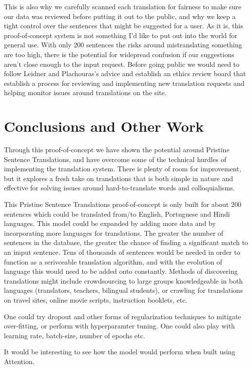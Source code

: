 \documentclass[runningheads]{llncs}
\begin{document}
This is also why we carefully scanned each translation for fairness to make sure our data was reviewed before putting it out to the public, and why we keep a tight control over the sentences that might be suggested for a user. As it is, this proof-of-concept system is not something I'd like to put out into the world for general use. With only 200 sentences the risks around mistranslating something are too high, there is the potential for widepread confusion if our suggestions aren't close enough to the input request. Before going public we would need to follow Leidner and Plachouras's advice and establish an ethics review board that establish a process for reviewing and implementing new translation requests and helping monitor issues around translations on the site.

	
	\section{Conclusions and Other Work}
	Through this proof-of-concept we have shown the potential around Pristine Sentence Translations, and have overcome some of the technical hurdles of implementing the translation system. There is plenty of room for improvement, but it explores a fresh take on translations that is both simple in nature and effective for solving issues around hard-to-translate words and colloquialisms. 
		
	This Pristine Sentence Translations proof-of-concept is only built for about 200 sentences which could be translated from/to English, Portuguese and Hindi languages. This model could be expanded by adding more data and by incorporating more languages for translations. The greater the number of sentences in the database, the greater the chance of finding a significant match to an imput sentence. Tens of thousands of sentences would be needed in order to function as a serivceable translation algorithm, and with the evolution of language this would need to be added onto constantly. Methods of discovering translations might include crowdsourcing to large groups knowledgeable in both languages (translators, teachers, bilingual students), or crawling for translations on travel sites, online movie scripts, instruction booklets, etc.
	
	One could try dropout and other forms of regularization techniques to mitigate over-fitting, or perform with hyperparamter tuning. One could also play with learning rate, batch-size, number of epochs etc.
	
	It would be interesting to see how the model would perform when built using Attention.
	
\end{document}

